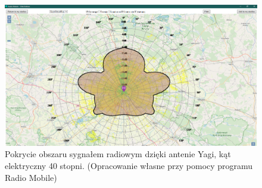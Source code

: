 		\begin{figure}[h!]
			\centering
			\includegraphics[scale=0.5]{Obrazki/Antenna_Yagi_Angle_40.png}
			\caption{Pokrycie obszaru sygnałem radiowym dzięki antenie Yagi, kąt elektryczny 40 stopni.
				\newline(Opracowanie własne przy pomocy programu Radio Mobile)}
			\label{fig:Obrazek_KatNachyleniaAnteny_40_Stopni}
		\end{figure}
